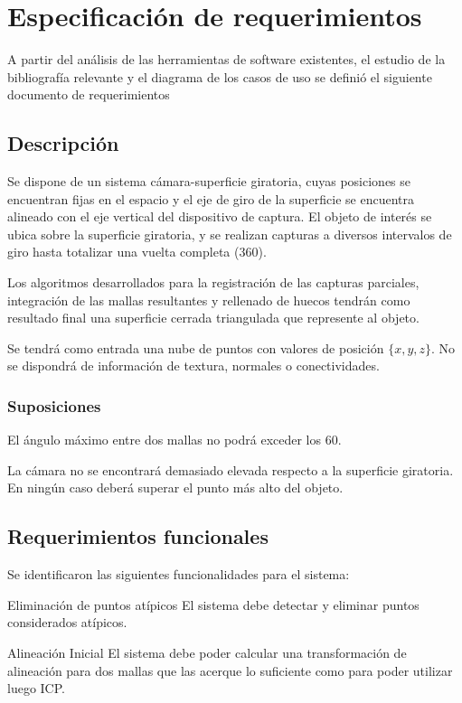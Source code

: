 \section{Especificación de requerimientos}
A partir del análisis de las herramientas de software existentes,
el estudio de la bibliografía relevante y el diagrama de los casos de uso
se definió el siguiente documento de requerimientos

\subsection{Descripción}
	Se dispone de un sistema cámara-superficie giratoria, cuyas posiciones
	se encuentran fijas en el espacio y el eje de giro de la superficie se
	encuentra alineado con el eje vertical del dispositivo de captura.
	El objeto de interés se ubica sobre la superficie giratoria, y se
	realizan capturas a diversos intervalos de giro
	hasta totalizar una vuelta completa (360\textdegree).

	Los algoritmos desarrollados para la registración de las capturas parciales,
	integración de las mallas resultantes y rellenado de huecos tendrán como resultado final
	una superficie cerrada triangulada que represente al objeto.

	Se tendrá como entrada una nube de puntos con valores de posición $\{x, y, z\}$.
	No se dispondrá de información de textura, normales o conectividades.

	\subsubsection{Suposiciones}
		El ángulo máximo entre dos mallas no podrá exceder los 60\textdegree.

		La cámara no se encontrará demasiado elevada respecto a la
		superficie giratoria. En ningún caso deberá superar el punto más alto del objeto.

\subsection{Requerimientos funcionales}
Se identificaron las siguientes funcionalidades para el sistema:

	\Requerimiento
		{Eliminación de puntos atípicos}
		{El sistema debe detectar y eliminar puntos considerados atípicos.}

	\Requerimiento
		{Alineación Inicial}
		{El sistema debe poder calcular una transformación de alineación para dos mallas
		que las acerque lo suficiente como para poder utilizar luego ICP.}

